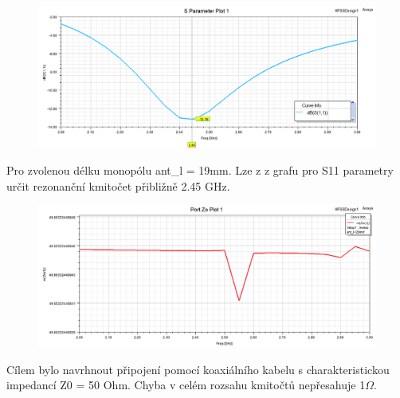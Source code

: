 \documentclass[10pt, a4paper]{article}%
\begin{document}
	\begin{figure}[ht!]
		\centering
		\includegraphics[width = 1\textwidth,height = 0.4\textheight]{S11.png}
	\end{figure}
Pro zvolenou délku monopólu ant\_l = 19mm. Lze z z grafu pro S11 parametry určit rezonanční kmitočet
přibližně 2.45 GHz. 
\clearpage
\begin{figure}[ht!]
	\centering
	\includegraphics[width = 1\textwidth]{Z0.png}
\end{figure}
Cílem bylo navrhnout připojení pomocí koaxiálního kabelu s charakteristickou impedancí Z0 = 50 Ohm.
Chyba v celém rozsahu kmitočtů nepřesahuje 1$\Omega$.
\end{document}
